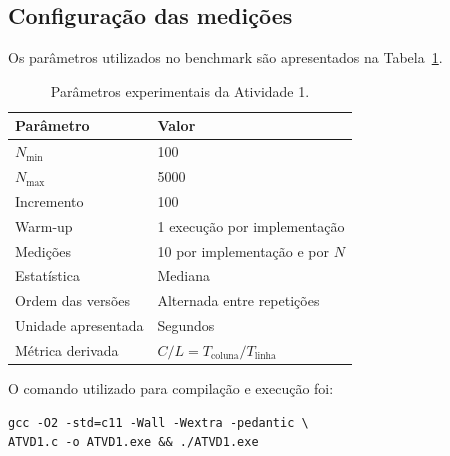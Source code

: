 \subsection{Configuração das medições}

Os parâmetros utilizados no benchmark são apresentados na
Tabela~\ref{tab:atvd01-parametros}.

\begin{table}[H]
    \centering

    \caption{Parâmetros experimentais da Atividade 1.}
    \label{tab:atvd01-parametros}

    \begin{tabular}{ll}
        \toprule
        \textbf{Parâmetro}
        &
        \textbf{Valor}
        \\
        \midrule

        \(N_{\min}\)
        &
        100
        \\

        \(N_{\max}\)
        &
        5000
        \\

        Incremento
        &
        100
        \\

        Warm-up
        &
        1 execução por implementação
        \\

        Medições
        &
        10 por implementação e por \(N\)
        \\

        Estatística
        &
        Mediana
        \\

        Ordem das versões
        &
        Alternada entre repetições
        \\

        Unidade apresentada
        &
        Segundos
        \\

        Métrica derivada
        &
        \(C/L=T_{\mathrm{coluna}}/T_{\mathrm{linha}}\)
        \\

        \bottomrule
    \end{tabular}

\end{table}

O comando utilizado para compilação e execução foi:

\begin{verbatim}
gcc -O2 -std=c11 -Wall -Wextra -pedantic \
ATVD1.c -o ATVD1.exe && ./ATVD1.exe
\end{verbatim}


